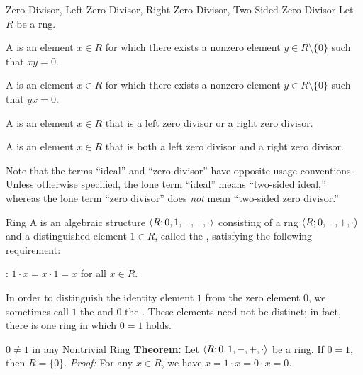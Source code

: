 \begin{dfnbox}{Zero Divisor, Left Zero Divisor, Right Zero Divisor, Two-Sided Zero Divisor}
	Let $R$ be a rng.
	\begin{dfnitems}
		\item A  is an element $x \in R$ for which there exists a nonzero element $y \in R \setminus \{0\}$ such that $xy = 0$.
		\item A  is an element $x \in R$ for which there exists a nonzero element $y \in R \setminus \{0\}$ such that $yx = 0$.
		\item A  is an element $x \in R$ that is a left zero divisor or a right zero divisor.
		\item A  is an element $x \in R$ that is both a left zero divisor and a right zero divisor.
	\end{dfnitems}
\end{dfnbox}

Note that the terms ``ideal'' and ``zero divisor'' have opposite usage conventions. Unless otherwise specified, the lone term ``ideal'' means ``two-sided ideal,'' whereas the lone term ``zero divisor'' does \textit{not} mean ``two-sided zero divisor.''

\begin{dfnbox}{Ring}
	A  is an algebraic structure ${\langle {R; 0, 1, -, +, \cdot} \rangle}$ consisting of a rng ${\langle {R; 0, -, +, \cdot} \rangle}$ and a distinguished element $1 \in R$, called the , satisfying the following requirement:
	\begin{dfnitems}
		\item {}: $1 \cdot x = x \cdot 1 = x$ for all $x \in R$.
	\end{dfnitems}
\end{dfnbox}

In order to distinguish the identity element $1$ from the zero element $0$, we sometimes call $1$ the  and $0$ the . These elements need not be distinct; in fact, there is one ring in which $0 = 1$ holds.

\begin{thmbox}{$0 \ne 1$ in any Nontrivial Ring}
	\textbf{Theorem:} Let ${\langle {R; 0, 1, -, +, \cdot} \rangle}$ be a ring. If $0 = 1$, then $R = \{0\}$.
\tcblower
	\textit{Proof:} For any $x \in R$, we have $x = 1 \cdot x = 0 \cdot x = 0$.
\end{thmbox}

